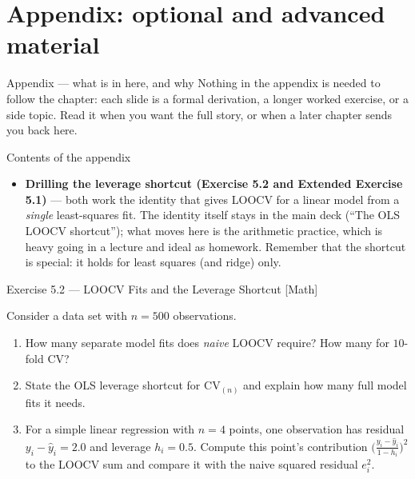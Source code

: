\documentclass[aspectratio=169,11pt]{beamer}
\begin{document}
\appendix
\AtBeginSection[]{}
\section{Appendix: optional and advanced material}

\begin{frame}{Appendix --- what is in here, and why}
  \small
  Nothing in the appendix is needed to follow the chapter: each slide is a
  formal derivation, a longer worked exercise, or a side topic. Read it when
  you want the full story, or when a later chapter sends you back here.
  \begin{block}{Contents of the appendix}
    \begin{itemize}
      \item \textbf{Drilling the leverage shortcut (Exercise 5.2 and Extended Exercise 5.1)} --- both work the identity that gives LOOCV for a linear model from a \emph{single} least-squares fit. The identity itself stays in the main deck (``The OLS LOOCV shortcut''); what moves here is the arithmetic practice, which is heavy going in a lecture and ideal as homework. Remember that the shortcut is special: it holds for least squares (and ridge) only.
    \end{itemize}
  \end{block}
\end{frame}


\begin{frame}{Exercise 5.2 --- LOOCV Fits and the Leverage Shortcut [Math]}
  \begin{exercise}
    Consider a data set with $n = 500$ observations.
    \begin{enumerate}
      \item How many separate model fits does \emph{naive} LOOCV
            require? How many for $10$-fold CV?
      \item State the OLS leverage shortcut for $\mathrm{CV}_{(n)}$ and
            explain how many full model fits it needs.
      \item For a simple linear regression with $n = 4$ points, one
            observation has residual $y_i - \hat y_i = 2.0$ and leverage
            $h_i = 0.5$. Compute this point's contribution
            $\bigl(\tfrac{y_i-\hat y_i}{1-h_i}\bigr)^2$ to the LOOCV sum
            and compare it with the naive squared residual $e_i^2$.
    \end{enumerate}
  \end{exercise}
\end{frame}
\end{document}
